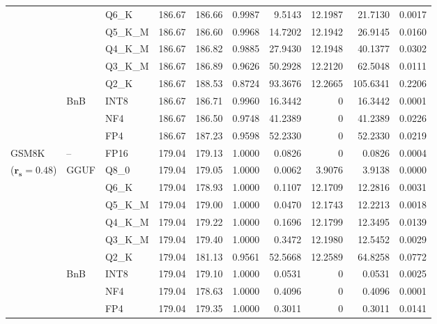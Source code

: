 \begin{longtable}{ll l rrrrrrr}
 &  & Q6\_K & 186.67 & 186.66 & 0.9987 & 9.5143 & 12.1987 & 21.7130 & 0.0017 \\
 &  & Q5\_K\_M & 186.67 & 186.60 & 0.9968 & 14.7202 & 12.1942 & 26.9145 & 0.0160 \\
 &  & Q4\_K\_M & 186.67 & 186.82 & 0.9885 & 27.9430 & 12.1948 & 40.1377 & 0.0302 \\
 &  & Q3\_K\_M & 186.67 & 186.89 & 0.9626 & 50.2928 & 12.2120 & 62.5048 & 0.0111 \\
 &  & Q2\_K & 186.67 & 188.53 & \cellcolor{red!18} 0.8724 & \cellcolor{red!18} 93.3676 & 12.2665 & \cellcolor{red!18} 105.6341 & \cellcolor{red!18} 0.2206 \\
 & BnB & INT8 & 186.67 & 186.71 & 0.9960 & 16.3442 & \cellcolor{cyan!12} $0$ & 16.3442 & 0.0001 \\
 &  & NF4 & 186.67 & 186.50 & 0.9748 & 41.2389 & \cellcolor{cyan!12} $0$ & 41.2389 & 0.0226 \\
 &  & FP4 & 186.67 & 187.23 & 0.9598 & 52.2330 & \cellcolor{cyan!12} $0$ & 52.2330 & 0.0219 \\
\midrule
GSM8K & -- & FP16 & 179.04 & 179.13 & 1.0000 & 0.0826 & \cellcolor{cyan!12} $0$ & 0.0826 & 0.0004 \\
{\small ($\mathbf{r_s{=}0.48}$)} & GGUF & Q8\_0 & 179.04 & 179.05 & 1.0000 & 0.0062 & 3.9076 & 3.9138 & 0.0000 \\
 &  & Q6\_K & 179.04 & 178.93 & 1.0000 & 0.1107 & 12.1709 & 12.2816 & 0.0031 \\
 &  & Q5\_K\_M & 179.04 & 179.00 & 1.0000 & 0.0470 & 12.1743 & 12.2213 & 0.0018 \\
 &  & Q4\_K\_M & 179.04 & 179.22 & 1.0000 & 0.1696 & 12.1799 & 12.3495 & 0.0139 \\
 &  & Q3\_K\_M & 179.04 & 179.40 & 1.0000 & 0.3472 & 12.1980 & 12.5452 & 0.0029 \\
 &  & Q2\_K & 179.04 & 181.13 & 0.9561 & 52.5668 & 12.2589 & 64.8258 & 0.0772 \\
 & BnB & INT8 & 179.04 & 179.10 & 1.0000 & 0.0531 & \cellcolor{cyan!12} $0$ & 0.0531 & 0.0025 \\
 &  & NF4 & 179.04 & 178.63 & 1.0000 & 0.4096 & \cellcolor{cyan!12} $0$ & 0.4096 & 0.0001 \\
 &  & FP4 & 179.04 & 179.35 & 1.0000 & 0.3011 & \cellcolor{cyan!12} $0$ & 0.3011 & 0.0141 \\
\end{longtable}
\endgroup